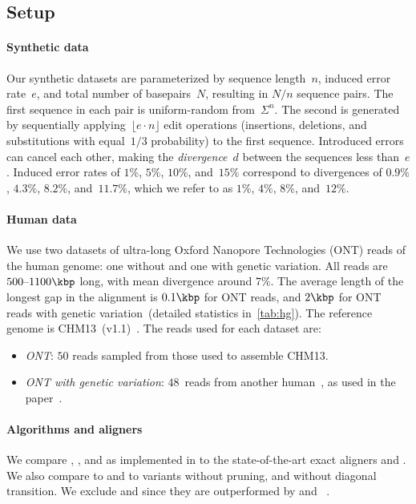 \subsection{Setup} \label{sec:evals-setup}

\paragraph{Synthetic data}
Our synthetic datasets are parameterized by sequence length~$n$, induced error
rate~$e$, and total number of basepairs~$N$, resulting in $N/n$ sequence pairs.
The first sequence in each pair is uniform-random from~$\Sigma^n$. The second is
generated by sequentially applying~$\lfloor e{\cdot} n\rfloor$ edit operations
(insertions, deletions, and substitutions with equal~$1/3$ probability) to the
first sequence. Introduced errors can cancel each other, making the
\emph{divergence}~$d$ between the sequences less than~$e$. Induced error rates
of $1\%$, $5\%$, $10\%$, and~$15\%$ correspond to divergences of $0.9\%$,
$4.3\%$, $8.2\%$, and~$11.7\%$, which we refer to as $1\%$, $4\%$, $8\%$,
and~$12\%$.

\paragraph{Human data}
We use two datasets%
of ultra-long Oxford Nanopore Technologies (ONT) reads of the human genome: one
without and one with genetic variation. All reads are $500\mbox{--}1100\kbp$
long, with mean divergence around $7\%$. The average length of the longest gap
in the alignment is
$0.1\kbp$ for ONT reads, and $2\kbp$ for ONT reads with genetic
variation~(detailed statistics in~\cref{tab:hg}).
The reference genome is
CHM13~(v1.1)~\citep{nurk2022complete}. The reads used for each dataset are:

\begin{itemize}
  \item \emph{ONT}: $50$ reads sampled from those used to assemble
        CHM13.
  \item \emph{ONT with genetic variation}: $48$~reads from another
        human~\citep{bowden2019sequencing}, as used in the \wfa
        paper~\citep{marco2022optimal}.
\end{itemize}

\paragraph{Algorithms and aligners}
We compare \SH, \CSH, and \GCH as implemented in \astarpa%
to the state-of-the-art exact aligners \wfa and \edlib. We also compare to
\dijkstra and to variants without pruning, and without diagonal transition. We
exclude \seqan and \parasail since they are outperformed by \wfa and
\edlib~\citep{marco2021fast}.

